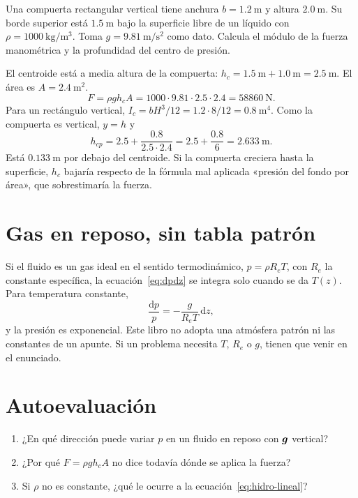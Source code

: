 \begin{problembox}
Una compuerta rectangular vertical tiene anchura \(b=\qty{1.2}{\metre}\) y altura \(\qty{2.0}{\metre}\). Su borde superior está \(\qty{1.5}{\metre}\) bajo la superficie libre de un líquido con \(\rho=\qty{1000}{\kilogram\per\cubic\metre}\). Toma \(g=\qty{9.81}{\metre\per\second\squared}\) como dato. Calcula el módulo de la fuerza manométrica y la profundidad del centro de presión.
\end{problembox}
\begin{solutionbox}
El centroide está a media altura de la compuerta: \(h_c=\qty{1.5}{\metre}+\qty{1.0}{\metre}=\qty{2.5}{\metre}\).
El área es \(A=\qty{2.4}{\square\metre}\).
\[
F=\rho g h_c A
=1000\cdot 9.81\cdot 2.5\cdot 2.4
=\qty{58860}{\newton}.
\]
Para un rectángulo vertical, \(I_c=b H^3/12=1.2\cdot 8/12=\qty{0.8}{\metre\tothe{4}}\). Como la compuerta es vertical, \(y=h\) y
\[
h_{cp}=2.5+\frac{0.8}{2.5\cdot 2.4}=2.5+\frac{0.8}{6}=\qty{2.633}{\metre}.
\]
Está \(\qty{0.133}{\metre}\) por debajo del centroide. Si la compuerta creciera hasta la superficie, \(h_c\) bajaría respecto de la fórmula mal aplicada «presión del fondo por área», que sobrestimaría la fuerza.
\end{solutionbox}

\section{Gas en reposo, sin tabla patrón}

Si el fluido es un gas ideal en el sentido termodinámico, \(p=\rho R_e T\), con \(R_e\) la constante específica, la ecuación~\eqref{eq:dpdz} se integra solo cuando se da \(T(z)\). Para temperatura constante,
\[
\frac{\mathrm{d}p}{p}=-\frac{g}{R_e T}\,\mathrm{d}z,
\]
y la presión es exponencial. Este libro no adopta una atmósfera patrón ni las constantes de un apunte. Si un problema necesita \(T\), \(R_e\) o \(g\), tienen que venir en el enunciado.

\section{Autoevaluación}
\begin{enumerate}[leftmargin=1.4em]
\item ¿En qué dirección puede variar \(p\) en un fluido en reposo con \(\boldsymbol{g}\) vertical?
\item ¿Por qué \(F=\rho g h_c A\) no dice todavía dónde se aplica la fuerza?
\item Si \(\rho\) no es constante, ¿qué le ocurre a la ecuación~\eqref{eq:hidro-lineal}?
\end{enumerate}
